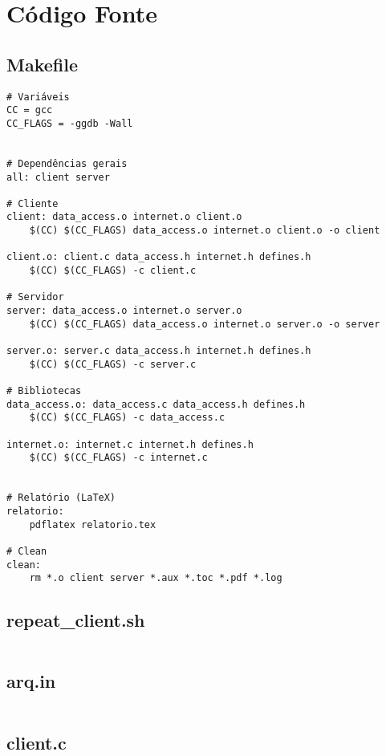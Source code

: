\documentclass[11pt,twoside]{article}
\begin{document}
\section{Código Fonte}
\subsection{Makefile}
\begin{verbatim}
# Variáveis
CC = gcc
CC_FLAGS = -ggdb -Wall


# Dependências gerais
all: client server

# Cliente
client: data_access.o internet.o client.o
	$(CC) $(CC_FLAGS) data_access.o internet.o client.o -o client

client.o: client.c data_access.h internet.h defines.h
	$(CC) $(CC_FLAGS) -c client.c

# Servidor
server: data_access.o internet.o server.o
	$(CC) $(CC_FLAGS) data_access.o internet.o server.o -o server

server.o: server.c data_access.h internet.h defines.h
	$(CC) $(CC_FLAGS) -c server.c

# Bibliotecas
data_access.o: data_access.c data_access.h defines.h
	$(CC) $(CC_FLAGS) -c data_access.c

internet.o: internet.c internet.h defines.h
	$(CC) $(CC_FLAGS) -c internet.c


# Relatório (LaTeX)
relatorio:
	pdflatex relatorio.tex

# Clean
clean:
	rm *.o client server *.aux *.toc *.pdf *.log
\end{verbatim}

\subsection{repeat\_client.sh}
\begin{verbatim}
\end{verbatim}

\subsection{arq.in}
\begin{verbatim}
\end{verbatim}

\subsection{client.c}
\begin{verbatim}
\end{verbatim}
\end{document}
